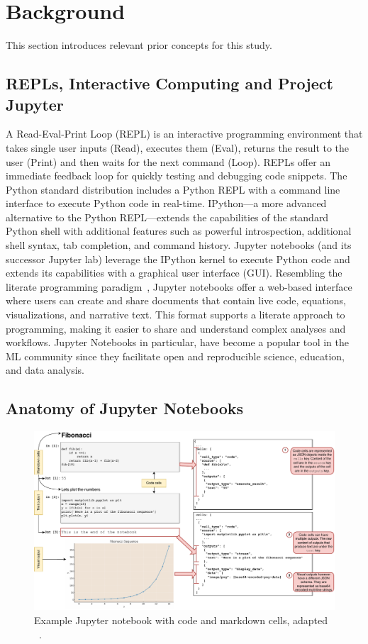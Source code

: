 \section{Background}\label{sec:background}

This section introduces relevant prior concepts for this study.

\subsection{REPLs, Interactive Computing and Project Jupyter}

A Read-Eval-Print Loop (REPL) is an interactive programming environment that takes single user inputs (Read), executes them (Eval), returns the result to the user (Print) and then waits for the next command (Loop). REPLs offer an immediate feedback loop for quickly testing and debugging code snippets. The Python standard distribution includes a Python REPL with a command line interface to execute Python code in real-time. IPython---a more advanced alternative to the Python REPL---extends the capabilities of the standard Python shell with additional features such as powerful introspection, additional shell syntax, tab completion, and command history. Jupyter notebooks (and its successor Jupyter lab) leverage the IPython kernel to execute Python code and extends its capabilities with a graphical user interface (GUI). Resembling the literate programming paradigm~\cite{knuth1984literate}, Jupyter notebooks offer a web-based interface where users can create and share documents that contain live code, equations, visualizations, and narrative text. This format supports a literate approach to programming, making it easier to share and understand complex analyses and workflows. Jupyter Notebooks in particular, have become a popular tool in the ML community since they facilitate open and reproducible science, education, and data analysis.

\subsection{Anatomy of Jupyter Notebooks}

\begin{figure}
  \centering
  \includegraphics[width=\linewidth]{nb.pdf}
  \caption{Example Jupyter notebook with code and markdown cells, adapted ~\cite[Figure~1]{pimentel2019large-scale}.}
  \label{fig:nb}
\end{figure}

